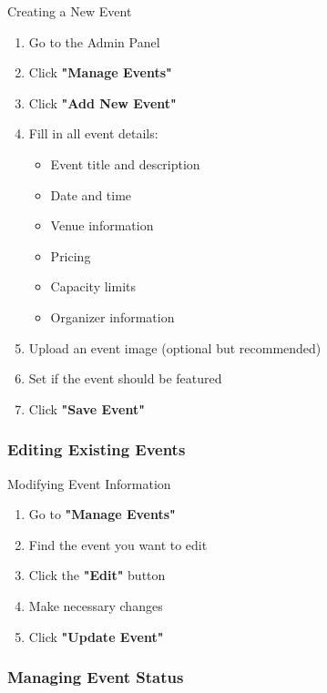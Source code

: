 \documentclass[12pt,a4paper]{article}
\begin{document}
\begin{stepbox}{Creating a New Event}
\begin{enumerate}
    \item Go to the Admin Panel
    \item Click \textbf{"Manage Events"}
    \item Click \textbf{"Add New Event"}
    \item Fill in all event details:
        \begin{itemize}
            \item Event title and description
            \item Date and time
            \item Venue information
            \item Pricing
            \item Capacity limits
            \item Organizer information
        \end{itemize}
    \item Upload an event image (optional but recommended)
    \item Set if the event should be featured
    \item Click \textbf{"Save Event"}
\end{enumerate}
\end{stepbox}

\subsubsection{Editing Existing Events}

\begin{stepbox}{Modifying Event Information}
\begin{enumerate}
    \item Go to \textbf{"Manage Events"}
    \item Find the event you want to edit
    \item Click the \textbf{"Edit"} button
    \item Make necessary changes
    \item Click \textbf{"Update Event"}
\end{enumerate}
\end{stepbox}

\subsubsection{Managing Event Status}
\end{document}
